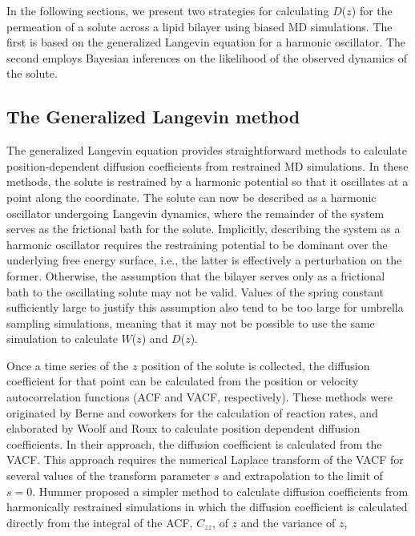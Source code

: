     \par In the following sections, we present two strategies for calculating $D$($z$) for the permeation of a solute across a lipid bilayer using biased MD simulations. The first is based on the generalized Langevin equation for a harmonic oscillator. The second employs Bayesian inferences on the likelihood of the observed dynamics of the solute.

    \subsection*{The Generalized Langevin method}
    \par The generalized Langevin equation provides straightforward methods to calculate 
    position-dependent diffusion coefficients from restrained MD simulations. In these methods, the solute is restrained by a harmonic potential so that it oscillates at a point along the coordinate. The solute can now be described as a harmonic oscillator undergoing Langevin dynamics, where the remainder of the system
    serves as the frictional bath for the solute. Implicitly, describing the system as a harmonic oscillator requires the restraining potential to be dominant over the underlying free energy surface, i.e., the latter is effectively a perturbation on the former.
    Otherwise, 
    the assumption that the bilayer serves only as a frictional bath to the oscillating solute may not be valid.  Values of the spring constant sufficiently large to justify this assumption also tend to be too large for umbrella sampling simulations, meaning that it may not be possible to use the same simulation to calculate $W$($z$) and $D$($z$).

    \par Once a time series of the $z$ position of the solute is collected, the diffusion coefficient for that point can be calculated from the position or velocity autocorrelation functions (ACF and VACF, respectively).  These methods were originated by Berne and coworkers for the calculation of reaction rates\cite{Berne1988}, and elaborated by Woolf and Roux to calculate position dependent diffusion coefficients.\cite{Woolf1994} In their approach, the diffusion coefficient is calculated from the VACF. This approach requires the numerical Laplace transform of the VACF for several values of the transform parameter $s$ and extrapolation to the limit of $s=0$. Hummer proposed a simpler method to calculate diffusion coefficients from harmonically restrained simulations\cite{Hummer2005} in which the diffusion coefficient is calculated directly  from the integral of the ACF, $C_{zz}$, of $z$ and the variance of $z$,

